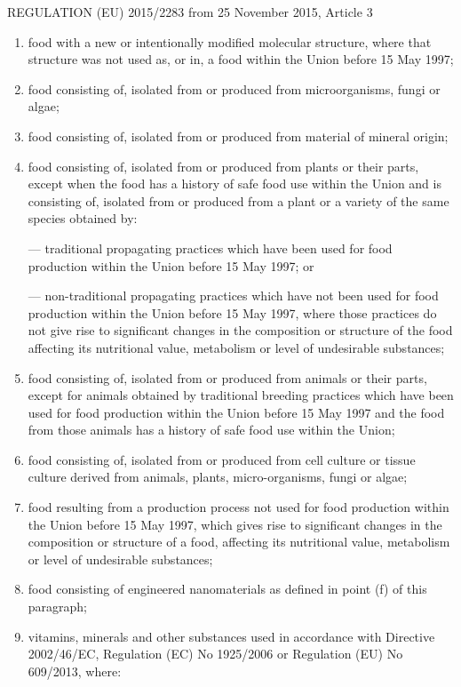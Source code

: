 \documentclass[12pt]{article}
\begin{document}
REGULATION (EU) 2015/2283 from 25 November 2015, Article 3

\begin{enumerate}[label=(\roman*)]
    \item food with a new or intentionally modified molecular structure, where that structure was not used as, or in, a food within the Union before 15 May 1997;
    \item food consisting of, isolated from or produced from microorganisms, fungi or algae;
    \item food consisting of, isolated from or produced from material of mineral origin;
    \item food consisting of, isolated from or produced from plants or their parts, except when the food has a history of safe food use within the Union and is consisting of, isolated from or produced from a plant or a variety of the same species obtained by:
    
    — traditional propagating practices which have been used for food production within the Union before
    15 May 1997; or

    — non-traditional propagating practices which have not been used for food production within the Union
    before 15 May 1997, where those practices do not give rise to significant changes in the composition or
    structure of the food affecting its nutritional value, metabolism or level of undesirable substances;
    \item food consisting of, isolated from or produced from animals or their parts, except for animals obtained by
    traditional breeding practices which have been used for food production within the Union before 15 May 1997
    and the food from those animals has a history of safe food use within the Union;
    \item food consisting of, isolated from or produced from cell culture or tissue culture derived from animals, plants,
    micro-organisms, fungi or algae;
    \item food resulting from a production process not used for food production within the Union before 15 May 1997,
    which gives rise to significant changes in the composition or structure of a food, affecting its nutritional value,
    metabolism or level of undesirable substances;
    \item  food consisting of engineered nanomaterials as defined in point (f) of this paragraph;
    \item  vitamins, minerals and other substances used in accordance with Directive 2002/46/EC, Regulation (EC)
    No 1925/2006 or Regulation (EU) No 609/2013, where:
    

\end{enumerate}
\end{document}
